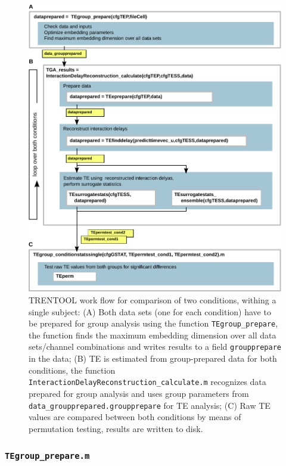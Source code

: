 \documentclass[a4paper,10pt]{article}
\begin{document}
\begin{figure}[H]	
	\centering	
 		\includegraphics[scale=0.90]{figures/TRENTOOL3_condstatssingle.pdf}
	\caption[TRENTOOL work flow for comparison of conditions]{TRENTOOL work flow for comparison of two conditions, withing a single subject: 
	(A) Both data sets (one for each condition) have to be prepared for group analysis using the function \texttt{TEgroup\_prepare}, the function finds the maximum embedding dimension over all data sets/channel combinations and writes results to a field \texttt{groupprepare} in the data;
	(B) TE is estimated from group-prepared data for both conditions, the function  \texttt{InteractionDelayReconstruction\_calculate.m} recognizes data prepared for group analysis and uses group parameters from \texttt{data\_groupprepared.groupprepare} for TE analysis;
	(C) Raw TE values are compared between both conditions by means of permutation testing, results are written to disk.
	}
	\label{fig:condstats}
\end{figure}


\subsubsection{\texttt{TEgroup\_prepare.m}}
\end{document}
